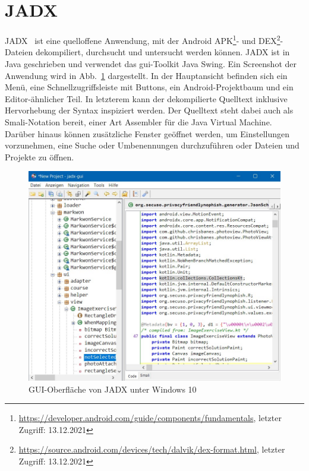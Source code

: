 \section{JADX}
\label{sec:jadx}
JADX~\cite{skylotSkylotJadx2013} ist eine quelloffene Anwendung, mit der Android APK\footnote{\url{https://developer.android.com/guide/components/fundamentals}, letzter Zugriff: 13.12.2021}- und DEX\footnote{\url{https://source.android.com/devices/tech/dalvik/dex-format.html}, letzter Zugriff: 13.12.2021}-Dateien dekompiliert, durchsucht und untersucht werden können. JADX ist in Java geschrieben und verwendet das \gls{gui}-Toolkit Java Swing. Ein Screenshot der Anwendung wird in Abb.~\ref{fig:jadx0} dargestellt. In der Hauptansicht befinden sich ein Menü, eine Schnellzugriffsleiste mit Buttons, ein Android-Projektbaum und ein Editor-ähnlicher Teil. In letzterem kann der dekompilierte Quelltext inklusive Hervorhebung der Syntax inspiziert werden. Der Quelltext steht dabei auch als Smali-Notation bereit, einer Art Assembler für die Java Virtual Machine. Darüber hinaus können zusätzliche Fenster geöffnet werden, um Einstellungen vorzunehmen, eine Suche oder Umbenennungen durchzuführen oder Dateien und Projekte zu öffnen.

\begin{figure}[tbh]
    \centering
    \includegraphics[width=\linewidth]{bilder/jadx.jpg}
    \caption{GUI-Oberfläche von JADX unter Windows 10} %
    \label{fig:jadx0}
\end{figure}

